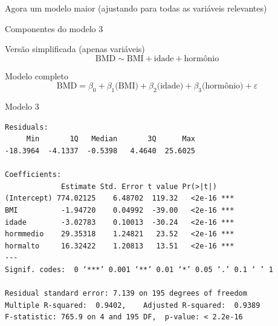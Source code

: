 \documentclass{beamer}
\begin{document}
\begin{frame}{\scriptsize }
  \begin{center}
    Agora um modelo maior (ajustando para todas as variáveis relevantes)
  \end{center}
\end{frame}

\begin{frame}{\scriptsize Componentes do modelo 3}
  \begin{block}{\footnotesize Versão simplificada (apenas variáveis)}
    \footnotesize
    \begin{displaymath}
      \text{BMD} \sim \text{BMI} + \text{idade} + \text{hormônio}
    \end{displaymath}
  \end{block}
  \bigskip
  \bigskip
  \begin{block}{Modelo completo}
    \footnotesize
    \begin{displaymath}
      \text{BMD} =\beta_0 + \beta_1 \text{(BMI)} + \beta_2 \text{(idade)} + \beta_3 \text{(hormônio)} +\varepsilon
    \end{displaymath}
  \end{block}
  \vfill
\end{frame}

\begin{frame}[fragile]{\scriptsize }
  \begin{center}
    \begin{exampleblock}{Modelo 3}
      \tiny
\begin{verbatim}
Residuals:
     Min       1Q   Median       3Q      Max 
-18.3964  -4.1337  -0.5398   4.4640  25.6025 

Coefficients:
             Estimate Std. Error t value Pr(>|t|)    
(Intercept) 774.02125    6.48702  119.32   <2e-16 ***
BMI          -1.94720    0.04992  -39.00   <2e-16 ***
idade        -3.02783    0.10013  -30.24   <2e-16 ***
hormmedio    29.35318    1.24821   23.52   <2e-16 ***
hormalto     16.32422    1.20813   13.51   <2e-16 ***
---
Signif. codes:  0 ‘***’ 0.001 ‘**’ 0.01 ‘*’ 0.05 ‘.’ 0.1 ‘ ’ 1

Residual standard error: 7.139 on 195 degrees of freedom
Multiple R-squared:  0.9402,	Adjusted R-squared:  0.9389 
F-statistic: 765.9 on 4 and 195 DF,  p-value: < 2.2e-16
\end{verbatim}
    \end{exampleblock}
  \end{center}
\end{frame}
\end{document}
